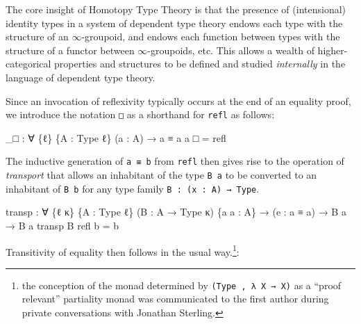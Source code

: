 \documentclass[
  11pt,
  oneside,
  article]{memoir}
\newenvironment{Shaded}{}{}
\newcommand{\NormalTok}[1]{#1}
\newcommand{\OtherTok}[1]{\textcolor[rgb]{0.00,0.44,0.13}{#1}}
\theoremstyle{definition}
\theoremstyle{plain}
\newcommand{\0}{\textsf{0}}
\newcommand{\1}{\tn{\textsf{1}}}
\begin{document}
The core insight of Homotopy Type Theory is that the presence of
(intensional) identity types in a system of dependent type theory endows
each type with the structure of an \(\infty\)-groupoid, and endows each
function between types with the structure of a functor between
\(\infty\)-groupoids, etc. This allows a wealth of higher-categorical
properties and structures to be defined and studied \emph{internally} in
the language of dependent type theory.

Since an invocation of reflexivity typically occurs at the end of an
equality proof, we introduce the notation \texttt{□} as a shorthand for
\texttt{refl} as follows:

\begin{Shaded}
\begin{Highlighting}[]
\OtherTok{\_}\NormalTok{□ }\OtherTok{:} \OtherTok{∀} \OtherTok{\{}\NormalTok{ℓ}\OtherTok{\}} \OtherTok{\{}\NormalTok{A }\OtherTok{:}\NormalTok{ Type ℓ}\OtherTok{\}} \OtherTok{(}\NormalTok{a }\OtherTok{:}\NormalTok{ A}\OtherTok{)} \OtherTok{→}\NormalTok{ a ≡ a}
\NormalTok{a □ }\OtherTok{=}\NormalTok{ refl}
\end{Highlighting}
\end{Shaded}

The inductive generation of \texttt{a\ ≡\ b} from \texttt{refl} then
gives rise to the operation of \emph{transport} that allows an
inhabitant of the type \texttt{B\ a} to be converted to an inhabitant of
\texttt{B\ b} for any type family \texttt{B\ :\ (x\ :\ A)\ →\ Type}.

\begin{Shaded}
\begin{Highlighting}[]
\NormalTok{transp }\OtherTok{:} \OtherTok{∀} \OtherTok{\{}\NormalTok{ℓ κ}\OtherTok{\}} \OtherTok{\{}\NormalTok{A }\OtherTok{:}\NormalTok{ Type ℓ}\OtherTok{\}} \OtherTok{(}\NormalTok{B }\OtherTok{:}\NormalTok{ A }\OtherTok{→}\NormalTok{ Type κ}\OtherTok{)} \OtherTok{\{}\NormalTok{a a\textquotesingle{} }\OtherTok{:}\NormalTok{ A}\OtherTok{\}} 
         \OtherTok{→} \OtherTok{(}\NormalTok{e }\OtherTok{:}\NormalTok{ a ≡ a\textquotesingle{}}\OtherTok{)} \OtherTok{→}\NormalTok{ B a }\OtherTok{→}\NormalTok{ B a\textquotesingle{}}
\NormalTok{transp B refl b }\OtherTok{=}\NormalTok{ b}
\end{Highlighting}
\end{Shaded}

Transitivity of equality then follows in the usual way.\footnote{the
  conception of the monad determined by \texttt{(Type\ ,\ λ\ X\ →\ X)}
  as a ``proof relevant'' partiality monad was communicated to the first
  author during private conversations with Jonathan Sterling.}:
\end{document}
